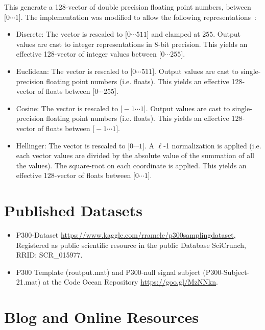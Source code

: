 This generate a 128-vector of double precision floating point numbers, between $  \big[  0 \cdots 1 \big] $.  The implementation was modified to allow the following representations~\cite{Arandjelovic2012}:

\begin{itemize}
\item Discrete:  The vector is rescaled to $ \big[  0 \cdots 511 \big] $ and clamped at $255$.  Output values are cast to integer representations in 8-bit precision.  This yields an effective 128-vector of integer values between $ \big[  0 \cdots 255 \big] $.
\item Euclidean: The vector is rescaled to $ \big[  0 \cdots 511 \big]  $.  Output values are cast to single-precision floating point numbers (i.e. floats).  This yields an effective 128-vector of floats between $\big[  0 \cdots 255 \big] $.
\item Cosine: The vector is rescaled to $ \big[  -1  \cdots 1 \big] $.  Output values are cast to single-precision floating point numbers (i.e. floats).  This yields an effective 128-vector of floats between $\big[ -1 \cdots 1 \big] $.
\item Hellinger:  The vector is rescaled to $ \big[  0 \cdots 1 \big] $.  A $\ell$-1 normalization is applied (i.e. each vector values are divided by the absolute value of the summation of all the values).  The square-root on each coordinate is applied.  This yields an effective 128-vector of floats between $\big[  0 \cdots 1 \big] $.
\end{itemize}


\section{Published Datasets}

\begin{itemize}
\item P300-Dataset \url{https://www.kaggle.com/rramele/p300samplingdataset}, Registered as public scientific resource in the public Database SciCrunch, RRID: SCR\_015977. 
\item P300 Template (routput.mat) and P300-null signal subject (P300-Subject-21.mat) at the Code Ocean Repository \url{https://goo.gl/MzNNkn}.
\end{itemize}

\section{Blog and Online Resources}

